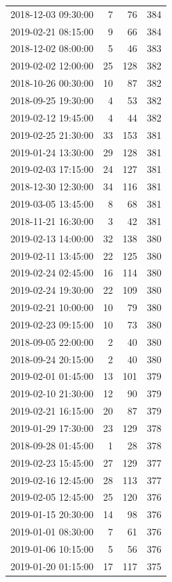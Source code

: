 \begin{tabular}{lrrr}
2018-12-03 09:30:00 & 7 & 76 & 384 \\
2019-02-21 08:15:00 & 9 & 66 & 384 \\
2018-12-02 08:00:00 & 5 & 46 & 383 \\
2019-02-02 12:00:00 & 25 & 128 & 382 \\
2018-10-26 00:30:00 & 10 & 87 & 382 \\
2018-09-25 19:30:00 & 4 & 53 & 382 \\
2019-02-12 19:45:00 & 4 & 44 & 382 \\
2019-02-25 21:30:00 & 33 & 153 & 381 \\
2019-01-24 13:30:00 & 29 & 128 & 381 \\
2019-02-03 17:15:00 & 24 & 127 & 381 \\
2018-12-30 12:30:00 & 34 & 116 & 381 \\
2019-03-05 13:45:00 & 8 & 68 & 381 \\
2018-11-21 16:30:00 & 3 & 42 & 381 \\
2019-02-13 14:00:00 & 32 & 138 & 380 \\
2019-02-11 13:45:00 & 22 & 125 & 380 \\
2019-02-24 02:45:00 & 16 & 114 & 380 \\
2019-02-24 19:30:00 & 22 & 109 & 380 \\
2019-02-21 10:00:00 & 10 & 79 & 380 \\
2019-02-23 09:15:00 & 10 & 73 & 380 \\
2018-09-05 22:00:00 & 2 & 40 & 380 \\
2018-09-24 20:15:00 & 2 & 40 & 380 \\
2019-02-01 01:45:00 & 13 & 101 & 379 \\
2019-02-10 21:30:00 & 12 & 90 & 379 \\
2019-02-21 16:15:00 & 20 & 87 & 379 \\
2019-01-29 17:30:00 & 23 & 129 & 378 \\
2018-09-28 01:45:00 & 1 & 28 & 378 \\
2019-02-23 15:45:00 & 27 & 129 & 377 \\
2019-02-16 12:45:00 & 28 & 113 & 377 \\
2019-02-05 12:45:00 & 25 & 120 & 376 \\
2019-01-15 20:30:00 & 14 & 98 & 376 \\
2019-01-01 08:30:00 & 7 & 61 & 376 \\
2019-01-06 10:15:00 & 5 & 56 & 376 \\
2019-01-20 01:15:00 & 17 & 117 & 375 \\

\end{tabular}
